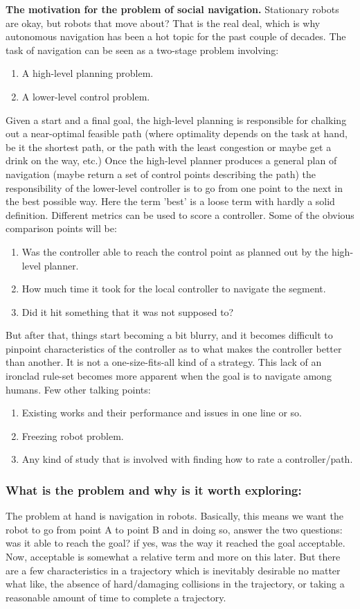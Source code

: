 \textbf{The motivation for the problem of social navigation.}
Stationary robots are okay, but robots that move about? That is the real deal, which is why autonomous navigation has been a hot topic for the past couple of decades. The task of navigation can be seen as a two-stage problem involving:
\begin{enumerate}
    \item A high-level planning problem.
    \item A lower-level control problem.
\end{enumerate}
Given a start and a final goal, the high-level planning is responsible for chalking out a near-optimal feasible path (where optimality depends on the task at hand, be it the shortest path, or the path with the least congestion or maybe get a drink on the way, etc.) Once the high-level planner produces a general plan of navigation (maybe return a set of control points describing the path) the responsibility of the lower-level controller is to go from one point to the next in the best possible way.
Here the term 'best' is a loose term with hardly a solid definition. Different metrics can be used to score a controller. Some of the obvious comparison points will be:
\begin{enumerate}
	\item Was the controller able to reach the control point as planned out by the high-level planner.
	\item How much time it took for the local controller to navigate the segment.
	\item Did it hit something that it was not supposed to?
\end{enumerate}
But after that, things start becoming a bit blurry, and it becomes difficult to pinpoint characteristics of the controller as to what makes the controller better than another. It is not a one-size-fits-all kind of a strategy. This lack of an ironclad rule-set becomes more apparent when the goal is to navigate among humans.
Few other talking points:
\begin{enumerate}
	\item Existing works and their performance and issues in one line or so.
	\item Freezing robot problem.
	\item Any kind of study that is involved with finding how to rate a controller/path. 
\end{enumerate}

\hline
\hline
\subsubsection*{What is the problem and why is it worth exploring:}
    The problem at hand is navigation in robots. Basically, this means we want the robot to go from point A to point B and in doing so, answer the two questions: was it able to reach the goal? if yes, was the way it reached the goal acceptable. Now, acceptable is somewhat a relative term and more on this later. But there are a few characteristics in a trajectory which is inevitably desirable no matter what like, the absence of hard/damaging collisions in the trajectory, or taking a reasonable amount of time to complete a trajectory. 
    

